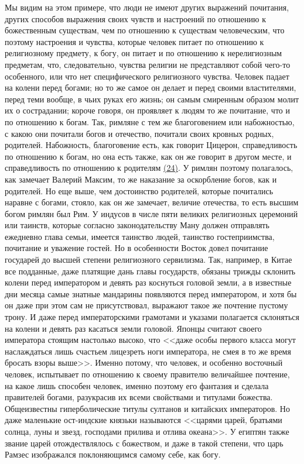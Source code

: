 \documentclass[12pt]{article}
\begin{document}
Мы видим на этом примере, что люди не имеют других выражений почитания, других способов выражения своих чувств и настроений по отношению к божественным существам, чем по отношению к существам человеческим, что поэтому настроения и чувства, которые человек питает по отношению к религиозному предмету, к богу, он питает и по отношению к нерелигиозным предметам, что, следовательно, чувства религии не представляют собой чего-то особенного, или что нет специфического религиозного чувства. Человек падает на колени перед богами; но то же самое он делает и перед своими властителями, перед теми вообще, в чьих руках его жизнь; он самым смиренным образом молит их о сострадании; короче говоря, он проявляет к людям то же почитание, что и по отношению к богам. Так, римляне с тем же благоговением или набожностью, с какою они почитали богов и отечество, почитали своих кровных родных, родителей. Набожность, благоговение есть, как говорит Цицерон, справедливость по отношению к богам, но она есть также, как он же говорит в другом месте, и справедливость по отношению к родителям \hyperlink{24}{(24)}\hypertarget{b24}{}. У римлян поэтому полагалось, как замечает Валерий Максим, то же наказание за оскорбление богов, как и родителей. Но еще выше, чем достоинство родителей, которые почитались наравне с богами, стояло, как он же замечает, величие отечества, то есть высшим богом римлян был Рим. У индусов в числе пяти великих религиозных церемоний или таинств, которые согласно законодательству Ману должен отправлять ежедневно глава семьи, имеется таинство людей, таинство гостеприимства, почитание и уважение гостей. Но в особенности Восток довел почитание государей до высшей степени религиозного сервилизма. Так, например, в Китае все подданные, даже платящие дань главы государств, обязаны трижды склонить колени перед императором и девять раз коснуться головой земли, а в известные дни месяца самые знатные мандарины появляются перед императором, и хотя бы он даже при этом сам не присутствовал, выражают такое же почтение пустому трону. И даже перед императорскими грамотами и указами полагается склоняться на колени и девять раз касаться земли головой. Японцы считают своего императора стоящим настолько высоко, что <<даже особы первого класса могут наслаждаться лишь счастьем лицезреть ноги императора, не смея в то же время бросать взоры выше>>. Именно потому, что человек, и особенно восточный человек, испытывает по отношению к своему правителю величайшее почтение, на какое лишь способен человек, именно поэтому его фантазия и сделала правителей богами, разукрасив их всеми свойствами и титулами божества. Общеизвестны гиперболические титулы султанов и китайских императоров. Но даже маленькие ост-индские князьки называются <<царями царей, братьями солнца, луны и звезд, господами прилива и отлива океана>>. У египтян также звание царей отождествлялось с божеством, и даже в такой степени, что царь Рамзес изображался поклоняющимся самому себе, как богу. 
\end{document}
